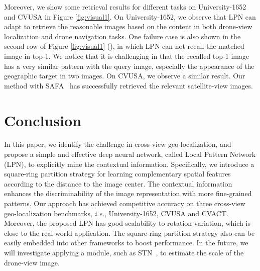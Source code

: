 \documentclass[journal]{IEEEtran}
\def\ie{\emph{i.e.}}
\begin{document}
Moreover, we show some retrieval results for different tasks on University-1652 and CVUSA in Figure \ref{fig:visual1}. On University-1652, we observe that LPN can adapt to retrieve the reasonable images based on the content in both drone-view localization and drone navigation tasks. One failure case is also shown in the second row of Figure \ref{fig:visual1} (\uppercase\expandafter{}), in which LPN can not recall the matched image in top-1. We notice that it is challenging in that the recalled top-1 image has a very similar pattern with the query image, especially the appearance of the geographic target in two images. 
On CVUSA, we observe a similar result. Our method with SAFA~\cite{shi_spatial-aware_nodate} has successfully retrieved the relevant satellite-view images.

\section{Conclusion}\label{conclusion}
In this paper, we identify the challenge in cross-view geo-localization, and propose a simple and effective deep neural network, called Local Pattern Network (LPN), to explicitly mine the contextual information. Specifically, we introduce a square-ring partition strategy for learning complementary spatial features according to the distance to the image center. The contextual information enhances the discriminability of the image representation with more fine-grained patterns. Our approach has achieved competitive accuracy on three cross-view geo-localization benchmarks, \ie, University-1652, CVUSA and CVACT. Moreover, the proposed LPN has good scalability to rotation variation, which is close to the real-world application. The square-ring partition strategy also can be easily embedded into other frameworks to boost performance. In the future, we will investigate applying a module, such as STN~\cite{jaderberg_spatial_2015}, to estimate the scale of the drone-view image.


\ifCLASSOPTIONcaptionsoff
  \newpage
\fi






\end{document}
